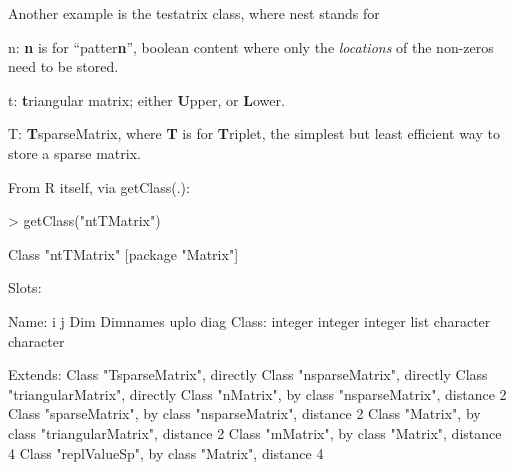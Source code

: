 \documentclass{article}
\begin{document}
{Another example is the testatrix class, where nest stands for
\begin{description}
\item{n: } \textbf{n} is for ``patter\textbf{n}'', boolean content where
  only the \emph{locations} of the non-zeros need to be stored.
\item{t: } \textbf{t}riangular matrix; either \textbf{U}pper, or \textbf{L}ower.
\item{T: } \textbf{T}sparseMatrix, where \textbf{T} is for \textbf{T}riplet,
  the simplest but least efficient way to store a sparse matrix.
\end{description}
From R itself, via getClass(.):
\begin{Schunk}
\begin{Sinput}
> getClass("ntTMatrix")
\end{Sinput}
\begin{Soutput}
Class "ntTMatrix" [package "Matrix"]

Slots:
                                                                  
Name:          i         j       Dim  Dimnames      uplo      diag
Class:   integer   integer   integer      list character character

Extends: 
Class "TsparseMatrix", directly
Class "nsparseMatrix", directly
Class "triangularMatrix", directly
Class "nMatrix", by class "nsparseMatrix", distance 2
Class "sparseMatrix", by class "nsparseMatrix", distance 2
Class "Matrix", by class "triangularMatrix", distance 2
Class "mMatrix", by class "Matrix", distance 4
Class "replValueSp", by class "Matrix", distance 4
\end{Soutput}
\end{Schunk}


}
\end{document}
